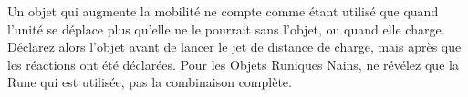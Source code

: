 Un objet qui augmente la mobilité ne compte comme étant utilisé que quand l'unité se déplace plus qu'elle ne le pourrait sans l'objet, ou quand elle charge. Déclarez alors l'objet avant de lancer le jet de distance de charge, mais après que les réactions ont été déclarées. Pour les Objets Runiques Nains, ne révélez que la Rune qui est utilisée, pas la combinaison complète.

